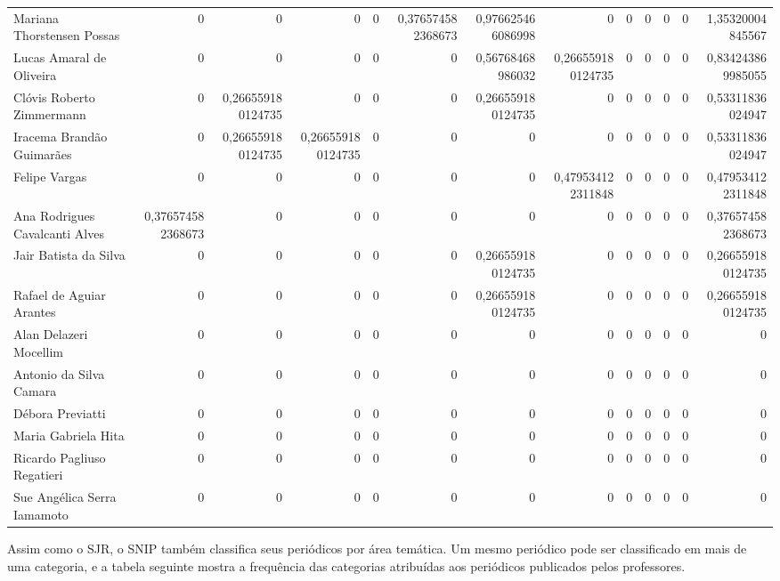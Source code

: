 \documentclass[12pt,brazil]{article}\usepackage[]{graphicx}\usepackage[]{xcolor}
\newcounter{tabela}
\begin{document}
\begin{longtable}{lrrrrrrrrrrrr}
Mariana Thorstensen Possas & 0 & 0 & 0 & 0 & 0,376574582368673 & 0,976625466086998 & 0 & 0 & 0 & 0 & 0 & 1,35320004845567 \\
Lucas Amaral de Oliveira & 0 & 0 & 0 & 0 & 0 & 0,56768468986032 & 0,266559180124735 & 0 & 0 & 0 & 0 & 0,834243869985055 \\
Clóvis Roberto Zimmermann & 0 & 0,266559180124735 & 0 & 0 & 0 & 0,266559180124735 & 0 & 0 & 0 & 0 & 0 & 0,53311836024947 \\
Iracema Brandão Guimarães & 0 & 0,266559180124735 & 0,266559180124735 & 0 & 0 & 0 & 0 & 0 & 0 & 0 & 0 & 0,53311836024947 \\
Felipe Vargas & 0 & 0 & 0 & 0 & 0 & 0 & 0,479534122311848 & 0 & 0 & 0 & 0 & 0,479534122311848 \\
Ana Rodrigues Cavalcanti Alves & 0,376574582368673 & 0 & 0 & 0 & 0 & 0 & 0 & 0 & 0 & 0 & 0 & 0,376574582368673 \\
Jair Batista da Silva & 0 & 0 & 0 & 0 & 0 & 0,266559180124735 & 0 & 0 & 0 & 0 & 0 & 0,266559180124735 \\
Rafael de Aguiar Arantes & 0 & 0 & 0 & 0 & 0 & 0,266559180124735 & 0 & 0 & 0 & 0 & 0 & 0,266559180124735 \\
Alan Delazeri Mocellim & 0 & 0 & 0 & 0 & 0 & 0 & 0 & 0 & 0 & 0 & 0 & 0 \\
Antonio da Silva Camara & 0 & 0 & 0 & 0 & 0 & 0 & 0 & 0 & 0 & 0 & 0 & 0 \\
Débora Previatti & 0 & 0 & 0 & 0 & 0 & 0 & 0 & 0 & 0 & 0 & 0 & 0 \\
\hline Maria Gabriela Hita & 0 & 0 & 0 & 0 & 0 & 0 & 0 & 0 & 0 & 0 & 0 & 0 \\
Ricardo Pagliuso Regatieri & 0 & 0 & 0 & 0 & 0 & 0 & 0 & 0 & 0 & 0 & 0 & 0 \\
Sue Angélica Serra Iamamoto & 0 & 0 & 0 & 0 & 0 & 0 & 0 & 0 & 0 & 0 & 0 & 0 \\
\end{longtable}


\clearpage

Assim como o SJR, o SNIP também classifica seus periódicos por área temática.
Um mesmo periódico pode ser classificado em mais de uma categoria, e a tabela
seguinte mostra a frequência das categorias atribuídas aos periódicos
publicados pelos professores.
\end{document}
